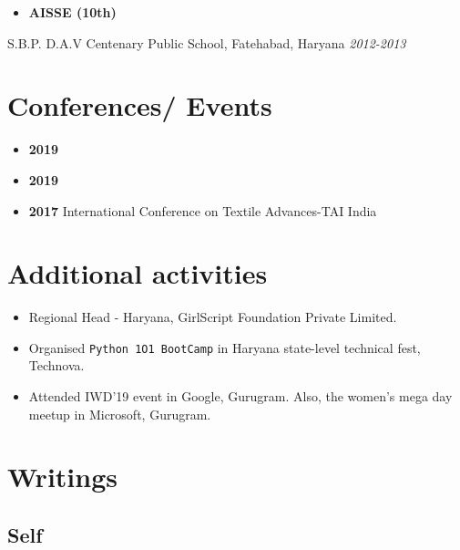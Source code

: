 \documentclass[]{article}
\let\oldhref\href
\renewcommand{\href}[3][blue]{\oldhref{#2}{\color{#1}{#3}}}
\providecommand{\tightlist}{%
  \setlength{\itemsep}{0pt}\setlength{\parskip}{0pt}}
\begin{document}
\begin{itemize}
\tightlist
\item
  \textbf{AISSE (10th)}
\end{itemize}

S.B.P. D.A.V Centenary Public School, Fatehabad, Haryana
\emph{2012-2013}

\hypertarget{conferences-events}{%
\section{Conferences/ Events}\label{conferences-events}}

\begin{itemize}
\tightlist
\item
  \textbf{2019} \href{https://in.pycon.org/2019/}{PyCon, India}
\item
  \textbf{2019}
  \href{http://www.fossevents.in/debutsav-delhi-055c485049d8493bbb92bd03f79ba8c2/}{DebUtsav,
  Delhi}
\item
  \textbf{2017} International Conference on Textile Advances-TAI India
\end{itemize}

\hypertarget{additional-activities}{%
\section{Additional activities}\label{additional-activities}}

\begin{itemize}
\tightlist
\item
  Regional Head - Haryana, GirlScript Foundation Private Limited.
\item
  Organised \texttt{Python\ 1O1\ BootCamp} in Haryana state-level
  technical fest, Technova.
\item
  Attended IWD'19 event in Google, Gurugram. Also, the women's mega day
  meetup in Microsoft, Gurugram.
\end{itemize}

\hypertarget{writings}{%
\section{Writings}\label{writings}}

\hypertarget{self}{%
\subsection{Self}\label{self}}
\end{document}
